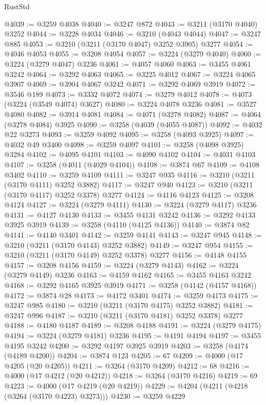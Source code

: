 \begin{lexlean}{RustStd}
\begin{coremodule}
@4039 := @3259 @4038
@4040 := @3247 @872
@4043 := @3211 (@3170 @4040) @3252
@4044 := @3228 @4034
@4046 := @3210 (@4043 @4044)
@4047 := @3247 @885
@4053 := @3210 (@3211 (@3170 @4047) @3252 @3905) @3277
@4054 := @4046 @4053
@4055 := @3208 @4054
@4057 := @3224 (@3279 @4040)
@4060 := @3224 (@3279 @4047) @3236
@4061 := @4057 @4060
@4063 := @3455 @4061 @3242
@4064 := @3292 @4063
@4065 := @3225 @4012
@4067 := @3224 @4065 @3907
@4069 := @3904 @4067 @3242
@4071 := @3292 @4069 @3919
@4072 := @3546 @189
@4073 := @3332 @4072
@4074 := @3279 @4012
@4078 := @4073 (@3224 (@3549 @4074) @3627)
@4080 := @3224 @4078 @3236
@4081 := @3527 @4080
@4082 := @3914 @4081
@4084 := @4071 (@3278 @4082)
@4087 := @4064 (@3278 @4084) @3925
@4090 := @3258 (@4039 (@4055 @4087))
@4092 := @4032 @22 @3273
@4093 := @3259 @4092
@4095 := @3258 (@4093 @3925)
@4097 := @4032 @49 @3400
@4098 := @3259 @4097
@4101 := @3258 (@4098 @3925) @3284
@4102 := @4095 @4101
@4103 := @4090 @4102
@4104 := @4031 @4103
@4107 := @3258 (@4011 (@4029 @4104))
@4108 := @3874 @67
@4109 := @4108 @3402
@4110 := @3259 @4109
@4111 := @3247 @935
@4116 := @3210 (@3211 (@3170 @4111) @3252 @3882)
@4117 := @3247 @940
@4123 := @3210 (@3211 (@3170 @4117) @3252 @3378) @3277
@4124 := @4116 @4123
@4125 := @3208 @4124
@4127 := @3224 (@3279 @4111)
@4130 := @3224 (@3279 @4117) @3236
@4131 := @4127 @4130
@4133 := @3455 @4131 @3242
@4136 := @3292 @4133 @3925 @3919
@4139 := @3258 (@4110 (@4125 @4136))
@4140 := @3874 @82
@4141 := @4140 @3401
@4142 := @3259 @4141
@4143 := @3247 @945
@4148 := @3210 (@3211 (@3170 @4143) @3252 @3882)
@4149 := @3247 @954
@4155 := @3210 (@3211 (@3170 @4149) @3252 @3378) @3277
@4156 := @4148 @4155
@4157 := @3208 @4156
@4159 := @3224 (@3279 @4143)
@4162 := @3224 (@3279 @4149) @3236
@4163 := @4159 @4162
@4165 := @3455 @4163 @3242
@4168 := @3292 @4165 @3925 @3919
@4171 := @3258 (@4142 (@4157 @4168))
@4172 := @3874 @28
@4173 := @4172 @3401
@4174 := @3259 @4173
@4175 := @3247 @985
@4180 := @3210 (@3211 (@3170 @4175) @3252 @3882)
@4181 := @3247 @996
@4187 := @3210 (@3211 (@3170 @4181) @3252 @3378) @3277
@4188 := @4180 @4187
@4189 := @3208 @4188
@4191 := @3224 (@3279 @4175)
@4194 := @3224 (@3279 @4181) @3236
@4195 := @4191 @4194
@4197 := @3455 @4195 @3242
@4200 := @3292 @4197 @3925 @3919
@4203 := @3258 (@4174 (@4189 @4200))
@4204 := @3874 @123
@4205 := 67
@4209 := @4000 (@17 @4205 (@20 @4205))
@4211 := @3264 (@3170 @4209)
@4212 := 68
@4216 := @4000 (@17 @4212 (@20 @4212))
@4218 := @3264 (@3170 @4216)
@4219 := 69
@4223 := @4000 (@17 @4219 (@20 @4219))
@4229 := @4204 (@4211 (@4218 (@3264 (@3170 @4223) @3273)))
@4230 := @3259 @4229

\end{coremodule}
\end{lexlean}
